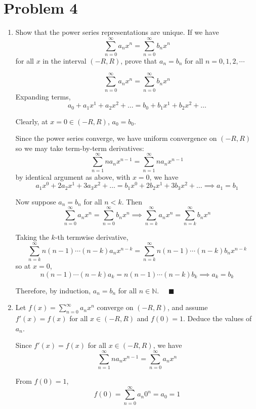 \documentclass[12pt]{article}
\newcommand{\N}{\mathbb{N}}
\newcommand{\qed}{\quad \blacksquare}
\begin{document}
\section*{Problem 4}
\begin{enumerate}
	\item Show that the power series representations are unique. If we have 
	\begin{equation*}
		\sum_{n=0}^{\infty}a_nx^n=\sum_{n=0}^{\infty}b_nx^n
	\end{equation*}
	for all $x$ in the interval $(-R,R)$, prove that $a_n=b_n$ for all $n=0,1,2,\cdots$

        \color{blue}
            \[\sum_{n=0}^{\infty} a_n x^n = \sum_{n = 0}^{\infty} b_n x^n\]
            Expanding terms, 
            \[a_0 + a_1 x^1 + a_2 x^2 + \dots = b_0 + b_1 x^1 + b_2 x^2 + \dots\]

            Clearly, at $x = 0 \in (-R, R)$, $a_0 = b_0$.           

            Since the power series converge, we have uniform convergence on $(-R, R)$ so we may take term-by-term derivatives: 
            \[\sum_{n=1}^{\infty} na_n x^{n-1} = \sum_{n=1}^{\infty} na_nx^{n-1}\]
            by identical argument as above, with $x = 0$, we have 
            \[a_1 x^0 + 2a_2 x^1 + 3a_3 x^2 + \dots = b_1 x^0 + 2b_2 x^1 + 3b_3 x^2 + \dots \implies a_1 = b_1\]

            Now suppose $a_n = b_n$ for all $n < k$. Then
            \[\sum_{n=0}^{\infty} a_n x^n = \sum_{n = 0}^{\infty} b_n x^n \implies \sum_{n=k}^{\infty} a_n x^n = \sum_{n=k}^{\infty} b_n x^n\]
    
            Taking the $k$-th termwise derivative, 
            \[\sum_{n=k}^{\infty} n(n-1)\cdots (n-k) a_{n}x^{n-k} = \sum_{n=k}^{\infty} n(n-1)\cdots (n-k) b_{n}x^{n-k}\]
            so at $x =0$, 
            \[n(n-1)\cdots(n-k)a_k = n(n-1)\cdots(n-k)b_k \implies a_k = b_k\]

            Therefore, by induction, $a_n = b_n$ for all $n \in \N$. $\qed$
        \color{black}

	\item Let $f(x)=\sum_{n=0}^\infty a_nx^n$ converge on $(-R,R)$, and assume $f'(x)=f(x)$ for all $x\in(-R,R)$ and $f(0)=1$. Deduce the values of $a_n$.
	
        \color{blue}
            Since $f'(x) = f(x)$ for all $x \in (-R, R)$, we have 
            \[\sum_{n=1}^{\infty} na_n x^{n-1}= \sum_{n=0}^{\infty} a_n x^n\]

            From $f(0) = 1$, 
            \[f(0) = \sum_{n=0}^{\infty} a_n 0^n = a_0 = 1 \]
            

\end{enumerate}
\end{document}
